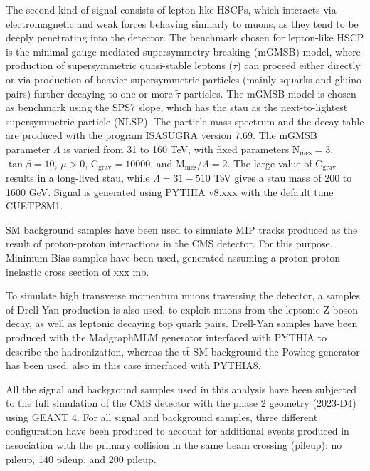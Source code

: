 \documentclass[11pt,twoside,a4paper]{article}
\begin{document}
The second kind of signal consists of lepton-like HSCPs, which interacts via electromagnetic and weak forces behaving similarly to muons, as they tend to be deeply penetrating into the detector.
The benchmark chosen for lepton-like HSCP is the minimal gauge mediated supersymmetry breaking (mGMSB) model, where production of supersymmetric quasi-stable leptons ($\tilde{\tau}$) can proceed either directly or via production of heavier supersymmetric particles (mainly squarks and gluino pairs) further decaying to one or more $\tilde{\tau}$ particles.
The mGMSB model is chosen as benchmark using the SPS7 slope, which has the stau as the next-to-lightest supersymmetric particle (NLSP). 
The particle mass spectrum and the decay table are produced with the program ISASUGRA version 7.69. The mGMSB parameter $\Lambda$ is varied from 31 to
160 TeV, with fixed parameters $\mathrm{N}_{\mathrm{mes}} = 3$, $\tan \beta = 10$, $\mu > 0$, $\mathrm{C}_{\mathrm{grav}} = 10000$, and $\mathrm{M}_{\mathrm{mes}}/\Lambda = 2$. 
The large value of $\mathrm{C}_{\mathrm{grav}}$ results in a long-lived stau, while $\Lambda = 31-510$ TeV gives a stau mass of 200 to 1600 GeV. 
Signal is generated using PYTHIA v8.xxx with the default tune CUETP8M1.

SM background samples have been used to simulate MIP tracks produced as the result of proton-proton interactions in the CMS detector.
For this purpose, Minimum Bias samples have been used, generated assuming a proton-proton inelastic cross section of xxx mb.

To simulate high transverse momentum muons traversing the detector, a samples of Drell-Yan production is also used, to exploit muons from the leptonic Z boson decay, as well as leptonic decaying top quark pairs.
Drell-Yan samples have been produced with the MadgraphMLM generator interfaced with PYTHIA to describe the hadronization, whereas the $\mathrm{t}\bar{\mathrm{t}}$ SM background the Powheg generator has been used, also in this case interfaced with PYTHIA8.

All the signal and background samples used in this analysis have been subjected to the full simulation of the CMS detector with the phase 2 geometry (2023-D4) using GEANT 4. 
For all signal and background samples, three different configuration have been produced to account for additional events produced in association with the primary collision in the same beam crossing (pileup): no pileup, 140 pileup, and 200 pileup.
\end{document}
